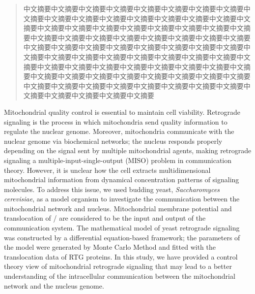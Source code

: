 

\begin{abstract}

中文摘要中文摘要中文摘要中文摘要中文摘要中文摘要中文摘要中文摘要中文摘要中文摘要中文摘要中文摘要中文摘要中文摘要中文摘要中文摘要中文摘要中文摘要中文摘要中文摘要中文摘要中文摘要中文摘要中文摘要中文摘要中文摘要中文摘要中文摘要中文摘要中文摘要中文摘要中文摘要中文摘要中文摘要中文摘要中文摘要中文摘要中文摘要中文摘要中文摘要中文摘要中文摘要中文摘要中文摘要中文摘要中文摘要中文摘要中文摘要中文摘要中文摘要中文摘要中文摘要中文摘要中文摘要中文摘要中文摘要中文摘要中文摘要中文摘要中文摘要中文摘要中文摘要中文摘要中文摘要中文摘要中文摘要中文摘要中文摘要中文摘要中文摘要中文摘要中文摘要中文摘要中文摘要中文摘要中文摘要中文摘要中文摘要中文摘要

\end{abstract}

\begin{abstract*}

    Mitochondrial quality control is essential to maintain cell viability. Retrograde signaling is the process in which mitochondria send quality information to regulate the nuclear genome. Moreover, mitochondria communicate with the nuclear genome via biochemical networks; the nucleus responds properly depending on the signal sent by multiple mitochondrial agents, making retrograde signaling a multiple-input-single-output (MISO) problem in communication theory. However, it is unclear how the cell extracts multidimensional mitochondrial information from dynamical concentration patterns of signaling molecules. To address this issue, we used budding yeast, \emph{Saccharomyces cerevisiae}, as a model organism to investigate the communication between the mitochondrial network and nucleus. Mitochondrial membrane potential and translocation of / are considered to be the input and output of the communication system. The mathematical model of yeast retrograde signaling was constructed by a differential equation-based framework; the parameters of the model were generated by Monte Carlo Method and fitted with the translocation data of RTG proteins. In this study, we have provided a control theory view of mitochondrial retrograde signaling that may lead to a better understanding of the intracellular communication between the mitochondrial network and the nucleus genome.

\end{abstract*}

